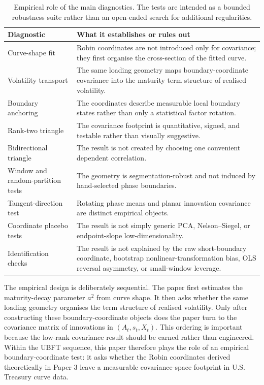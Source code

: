 \documentclass[11pt]{article}
\begin{document}
\begin{table}[!htbp]
\centering
\small
\begin{tabular}{p{}p{}}
\toprule
Diagnostic & What it establishes or rules out \\
\midrule
Curve-shape fit & Robin coordinates are not introduced only for covariance; they first organise the cross-section of the fitted curve. \\
Volatility transport & The same loading geometry maps boundary-coordinate covariance into the maturity term structure of realised volatility. \\
Boundary anchoring & The coordinates describe measurable local boundary states rather than only a statistical factor rotation. \\
Rank-two triangle & The covariance footprint is quantitative, signed, and testable rather than visually suggestive. \\
Bidirectional triangle & The result is not created by choosing one convenient dependent correlation. \\
Window and random-partition tests & The geometry is segmentation-robust and not induced by hand-selected phase boundaries. \\
Tangent-direction test & Rotating phase means and planar innovation covariance are distinct empirical objects. \\
Coordinate placebo tests & The result is not simply generic PCA, Nelson--Siegel, or endpoint-slope low-dimensionality. \\
Identification checks & The result is not explained by the raw short-boundary coordinate, bootstrap nonlinear-transformation bias, OLS reversal asymmetry, or small-window leverage. \\
\bottomrule
\end{tabular}
\caption{Empirical role of the main diagnostics. The tests are intended as a bounded robustness suite rather than an open-ended search for additional regularities.}
\label{tab:evidentiary_logic}
\end{table}

The empirical design is deliberately sequential. The paper first estimates the maturity-decay parameter $a^2$ from curve shape. It then asks whether the same loading geometry organises the term structure of realised volatility. Only after constructing these boundary-coordinate objects does the paper turn to the covariance matrix of innovations in $(A_t,s_t,X_t)$. This ordering is important because the low-rank covariance result should be earned rather than engineered. Within the UBFT sequence, this paper therefore plays the role of an empirical boundary-coordinate test: it asks whether the Robin coordinates derived theoretically in Paper 3 leave a measurable covariance-space footprint in U.S. Treasury curve data.
\end{document}
